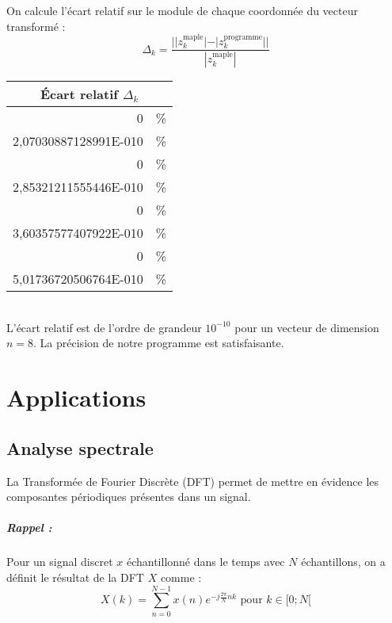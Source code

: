 \documentclass{report}
\begin{document}
	On calcule l'écart relatif sur le module de chaque coordonnée du vecteur transformé :
	\[
		\Delta_k = { \frac{||z^\text{maple}_k| - |z^\text{programme}_k||}{|z^\text{maple}_k|} }
	\]
	\begin{table}
	\begin{center}
		\begin{tabular}{| r l |}
			\hline
			\multicolumn{2}{|c|}{Écart relatif $\Delta_k$} \\
			\hline
			0 							& \% \\
			2,07030887128991E-010		& \% \\
			0 							& \% \\
			2,85321211555446E-010 		& \% \\
			0 							& \% \\
			3,60357577407922E-010 		& \% \\
			0 							& \% \\
			5,01736720506764E-010 		& \% \\
			\hline
		\end{tabular}
	\end{center}
	\end{table}\\
	L'écart relatif est de l'ordre de grandeur $10^{-10}$ pour un vecteur de dimension $n=8$. La précision de notre programme est satisfaisante.




	\chapter{Applications}

	\section{Analyse spectrale}
	La Transformée de Fourier Discrète (DFT) permet de mettre en évidence les composantes périodiques présentes dans un signal.
	
		\paragraph{Rappel : } Pour un signal discret $x$ échantillonné dans le temps avec $N$ échantillons, on a définit le résultat de la DFT $X$ comme :
		\[
			X(k) = \sum_{n=0}^{N-1} x(n) e^{-j\frac{2\pi}{N} nk} \text{ pour } k\in[0; N[
		\]
		
\end{document}
